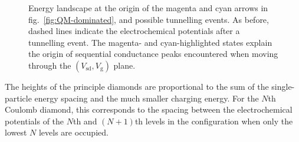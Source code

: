 \documentclass[a4paper,11pt]{article}
\begin{document}
\begin{figure}
\begin{center}
{
        }
        \caption{Energy landscape at the origin of the magenta and cyan arrows in fig.~\ref{fig:QM-dominated}, and possible tunnelling events. As before, dashed lines indicate the electrochemical potentials after a tunnelling event. The magenta- and cyan-highlighted states explain the origin of sequential conductance peaks encountered when moving through the $\left(V_\mathrm{sd},V_\mathrm{g}\right)$ plane.}
        \label{fig:QM_red-blue}
    \end{center}
    \end{figure}

    The heights of the principle diamonds are proportional to the sum of the single-particle energy spacing and the much smaller charging energy. For the $N$th Coulomb diamond, this corresponds to the spacing between the electrochemical potentials of the $N$th and $\left(N+1\right)$th levels in the configuration when only the lowest $N$ levels are occupied.
\end{document}
